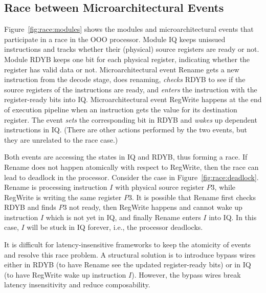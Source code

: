 \documentclass[conference]{IEEEtran}
\begin{document}
\subsection{Race between Microarchitectural Events}\label{sec:cmd:iq}
Figure~\ref{fig:race:modules} shows the modules and microarchitectural events that participate in a race in the OOO processor.
Module IQ keeps unissued instructions and tracks whether their (physical) source registers are ready or not.
Module RDYB keeps one bit for each physical register, indicating whether the register has valid data or not.
Microarchitectural event {Rename} gets a new instruction from the decode stage, does renaming, \emph{checks} RDYB to see if the source registers of the instructions are ready, and \emph{enters} the instruction with the register-ready bits into IQ.
Microarchitectural event {RegWrite} happens at the end of execution pipeline when an instruction gets the value for its destination register.
The event \emph{sets} the corresponding bit in RDYB and \emph{wakes} up dependent instructions in IQ.
(There are other actions performed by the two events, but they are unrelated to the race case.)

Both events are accessing the states in IQ and RDYB, thus forming a race.
If Rename does not happen atomically with respect to RegWrite, then the race can lead to deadlock in the processor.
Consider the case in Figure~\ref{fig:race:deadlock}.
Rename is processing instruction $I$ with physical source register $P3$, while RegWrite is writing the same register $P3$.
It is possible that Rename first checks RDYB and finds $P3$ not ready, then RegWrite happens and cannot wake up instruction $I$ which is not yet in IQ, and finally Rename enters $I$ into IQ.
In this case, $I$ will be stuck in IQ forever, i.e., the processor deadlocks.

It is difficult for latency-insensitive frameworks to keep the atomicity of events and resolve this race problem.
A structural solution is to introduce bypass wires either in RDYB (to have Rename see the updated register-ready bits) or in IQ (to have RegWrite wake up instruction $I$).
However, the bypass wires break latency insensitivity and reduce composability.
\end{document}
